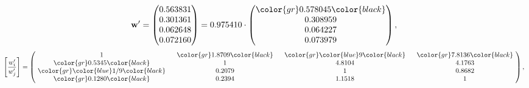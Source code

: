 \begin{example}
\begin{equation*}
\mathbf{w}^{\prime} =
\begin{pmatrix}
0.563831\\
0.301361\\
0.062648\\
0.072160
\end{pmatrix} =
0.975410\cdot
\begin{pmatrix}
\color{gr} 0.578045\color{black} \\
0.308959\\
0.064227\\
0.073979
\end{pmatrix},
\end{equation*}
\begin{equation*}
\left[ \frac{{w}^{\prime}_i}{{w}^{\prime}_j} \right] =
\begin{pmatrix}
$\,\,$ 1 $\,\,$ & $\,\,$\color{gr} 1.8709\color{black} $\,\,$ & $\,\,$\color{gr} \color{blue} 9\color{black} $\,\,$ & $\,\,$\color{gr} 7.8136\color{black} $\,\,$ \\
$\,\,$\color{gr} 0.5345\color{black} $\,\,$ & $\,\,$ 1 $\,\,$ & $\,\,$4.8104$\,\,$ & $\,\,$4.1763  $\,\,$ \\
$\,\,$\color{gr} \color{blue}  1/9\color{black} $\,\,$ & $\,\,$0.2079$\,\,$ & $\,\,$ 1 $\,\,$ & $\,\,$0.8682 $\,\,$ \\
$\,\,$\color{gr} 0.1280\color{black} $\,\,$ & $\,\,$0.2394$\,\,$ & $\,\,$1.1518$\,\,$ & $\,\,$ 1  $\,\,$ \\
\end{pmatrix},
\end{equation*}
\end{example}
\newpage
